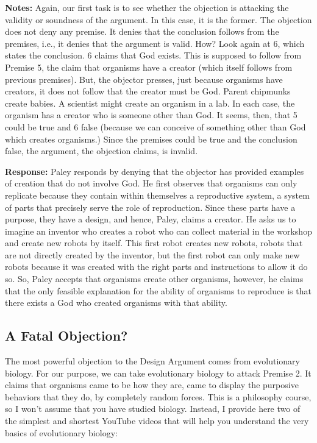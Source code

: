 \documentclass[]{article}
\begin{document}
\textbf{Notes:} Again, our first task is to see whether the objection is
attacking the validity or soundness of the argument. In this case, it is
the former. The objection does not deny any premise. It denies that the
conclusion follows from the premises, i.e., it denies that the argument
is valid. How? Look again at 6, which states the conclusion. 6 claims
that God exists. This is supposed to follow from Premise 5, the claim
that organisms have a creator (which itself follows from previous
premises). But, the objector presses, just because organisms have
creators, it does not follow that the creator must be God. Parent
chipmunks create babies. A scientist might create an organism in a lab.
In each case, the organism has a creator who is someone other than God.
It seems, then, that 5 could be true and 6 false (because we can
conceive of something other than God which creates organisms.) Since the
premises could be true and the conclusion false, the argument, the
objection claims, is invalid.

\textbf{Response:} Paley responds by denying that the objector has
provided examples of creation that do not involve God. He first observes
that organisms can only replicate because they contain within themselves
a reproductive system, a system of parts that precisely serve the role
of reproduction. Since these parts have a purpose, they have a design,
and hence, Paley, claims a creator. He asks us to imagine an inventor
who creates a robot who can collect material in the workshop and create
new robots by itself. This first robot creates new robots, robots that
are not directly created by the inventor, but the first robot can only
make new robots because it was created with the right parts and
instructions to allow it do so. So, Paley accepts that organisms create
other organisms, however, he claims that the only feasible explanation
for the ability of organisms to reproduce is that there exists a God who
created organisms with that ability.

\subsection{A Fatal Objection?}\label{a-fatal-objection}

The most powerful objection to the Design Argument comes from
evolutionary biology. For our purpose, we can take evolutionary biology
to attack Premise 2. It claims that organisms came to be how they are,
came to display the purposive behaviors that they do, by completely
random forces. This is a philosophy course, so I won't assume that you
have studied biology. Instead, I provide here two of the simplest and
shortest YouTube videos that will help you understand the very basics of
evolutionary biology:
\end{document}

